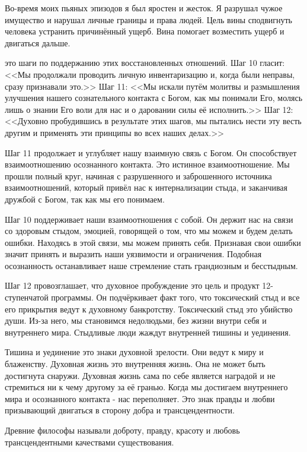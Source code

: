 \documentclass[10pt, fleqn]{article}
\begin{document}
Во-время моих пьяных эпизодов я был яростен и жесток. Я разрушал чужое имущество и нарушал личные границы и права людей. Цель вины сподвигнуть человека устранить причинённый ущерб. Вина помогает возместить ущерб и двигаться дальше.

 это шаги по поддержанию этих восстановленных отношений. Шаг 10 гласит: <<Мы продолжали проводить личную инвентаризацию и, когда были неправы, сразу признавали это.>> Шаг 11: <<Мы искали путём молитвы и размышления улучшения нашего сознательного контакта с Богом, как мы понимали Его, молясь лишь о знании Его воли для нас и о даровании силы её исполнить.>> Шаг 12: <<Духовно пробудившись в результате этих шагов, мы пытались нести эту весть другим и применять эти принципы во всех наших делах.>>

Шаг 11 продолжает и углубляет нашу взаимную связь с Богом. Он способствует взаимоотношению осознанного контакта. Это истинное взаимоотношение. Мы прошли полный круг, начиная с разрушенного и заброшенного источника взаимоотношений, который привёл нас к интернализации стыда, и заканчивая дружбой с Богом, так как мы его понимаем.

Шаг 10 поддерживает наши взаимоотношения с собой. Он держит нас на связи со здоровым стыдом, эмоцией, говорящей о том, что мы можем и будем делать ошибки. Находясь в этой связи, мы можем принять себя. Признавая свои ошибки значит принять и выразить наши уязвимости и ограничения. Подобная осознанность останавливает наше стремление стать грандиозным и бесстыдным.

Шаг 12 провозглашает, что духовное пробуждение это цель и продукт 12-ступенчатой программы. Он подчёркивает факт того, что токсический стыд и все его прикрытия ведут к духовному банкротству. Токсический стыд это убийство души. Из-за него, мы становимся недолюдьми, без жизни внутри себя и внутреннего мира. Стыдливые люди жаждут внутренней тишины и уединения.

Тишина и уединение это знаки духовной зрелости. Они ведут к миру и блаженству. Духовная жизнь это внутренняя жизнь. Она не может быть достигнута снаружи. Духовная жизнь сама по себе является наградой и не стремиться ни к чему другому за её гранью. Когда мы достигаем внутреннего мира и осознанного контакта - нас переполняет. Это знак правды и любви призывающий двигаться в сторону добра и трансцендентности.

Древние философы называли доброту, правду, красоту и любовь трансцендентными качествами существования.
\end{document}
